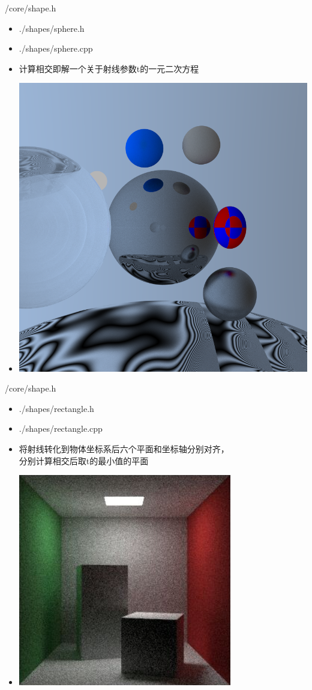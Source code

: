 \documentclass{beamer}
\begin{document}
\begin{frame} {/core/shape.h}
\begin{itemize} [<+->]
\item ./shapes/sphere.h
\item ./shapes/sphere.cpp
\item 计算相交即解一个关于射线参数t的一元二次方程
\item \includegraphics[scale=0.20]{spheres}
\end{itemize}
\end{frame}

\begin{frame} {/core/shape.h}
\begin{itemize} [<+->]
\item ./shapes/rectangle.h
\item ./shapes/rectangle.cpp
\item 将射线转化到物体坐标系后六个平面和坐标轴分别对齐，\\ 分别计算相交后取t的最小值的平面
\item \includegraphics[scale=0.40]{rect}
\end{itemize}
\end{frame}
\end{document}
